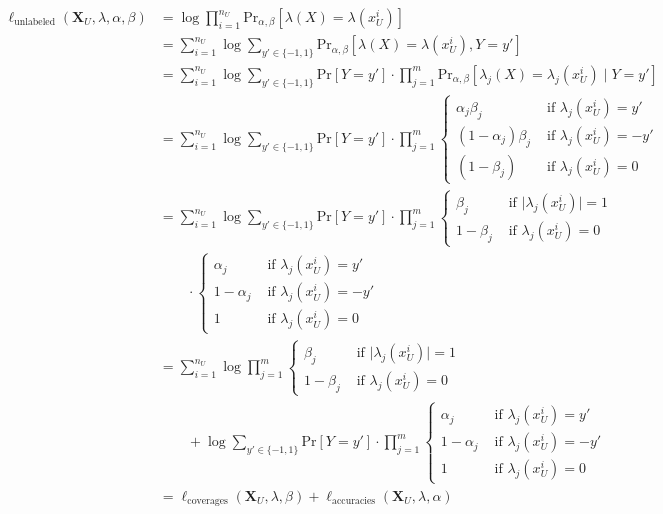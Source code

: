 \begin{align*}
    \ell_\text{unlabeled}(\boldsymbol{X}_U,\lambda,\alpha,\beta)&=\log\prod_{i=1}^{n_U}\text{Pr}_{\alpha,\beta}[\lambda(X)=\lambda(x^i_U)]\\
    &=\sum_{i=1}^{n_U}\log\sum_{y'\in\{-1,1\}}\text{Pr}_{\alpha,\beta}[\lambda(X)=\lambda(x^i_U), Y=y']\\
    &=\sum_{i=1}^{n_U}\log\sum_{y'\in\{-1,1\}}\text{Pr}[Y=y']\cdot\prod_{j=1}^m\text{Pr}_{\alpha,\beta}[\lambda_j(X)=\lambda_j(x^i_U)\mid Y=y']\\
    &=\sum_{i=1}^{n_U}\log\sum_{y'\in\{-1,1\}}\text{Pr}[Y=y']\cdot\prod_{j=1}^m\begin{cases}
        \alpha_j\beta_j&\text{ if }\lambda_j(x^i_U)=y'\\
        (1-\alpha_j)\beta_j&\text{ if }\lambda_j(x^i_U)=-y'\\
        (1-\beta_j)&\text{ if }\lambda_j(x^i_U)=0
    \end{cases}\\
    &=\sum_{i=1}^{n_U}\log\sum_{y'\in\{-1,1\}}\text{Pr}[Y=y']\cdot\prod_{j=1}^m\begin{cases}
        \beta_j&\text{ if }\lvert\lambda_j(x^i_U)\rvert=1\\
        1-\beta_j&\text{ if }\lambda_j(x^i_U)=0
    \end{cases}\\
    &\qquad\cdot\begin{cases}
        \alpha_j&\text{ if }\lambda_j(x^i_U)=y'\\
        1-\alpha_j&\text{ if }\lambda_j(x^i_U)=-y'\\
        1&\text{ if }\lambda_j(x^i_U)=0
    \end{cases}\\
    &=\sum_{i=1}^{n_U}\log\prod_{j=1}^m\begin{cases}
        \beta_j&\text{ if }\lvert\lambda_j(x^i_U)\rvert=1\\
        1-\beta_j&\text{ if }\lambda_j(x^i_U)=0
    \end{cases}\\
    &\qquad+\log\sum_{y'\in\{-1,1\}}\text{Pr}[Y=y']\cdot\prod_{j=1}^m\begin{cases}
        \alpha_j&\text{ if }\lambda_j(x^i_U)=y'\\
        1-\alpha_j&\text{ if }\lambda_j(x^i_U)=-y'\\
        1&\text{ if }\lambda_j(x^i_U)=0
    \end{cases}\\
    &=\ell_\text{coverages}(\boldsymbol{X}_U,\lambda,\beta)+\ell_\text{accuracies}(\boldsymbol{X}_U,\lambda,\alpha)
\end{align*}
